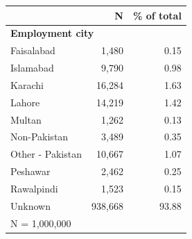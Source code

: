 \begin{tabular}{lrr}


\toprule


 & N & \% of total \\


\midrule


\multicolumn{3}{l}{\textbf{Employment city}}\\ 
\midrule
Faisalabad          &       1,480&        0.15\\
Islamabad           &       9,790&        0.98\\
Karachi             &      16,284&        1.63\\
Lahore              &      14,219&        1.42\\
Multan              &       1,262&        0.13\\
Non-Pakistan        &       3,489&        0.35\\
Other - Pakistan    &      10,667&        1.07\\
Peshawar            &       2,462&        0.25\\
Rawalpindi          &       1,523&        0.15\\
Unknown             &     938,668&       93.88\\
\midrule


\multicolumn{3}{l}{\footnotesize N =    1,000,000}\\


\bottomrule


\end{tabular}



